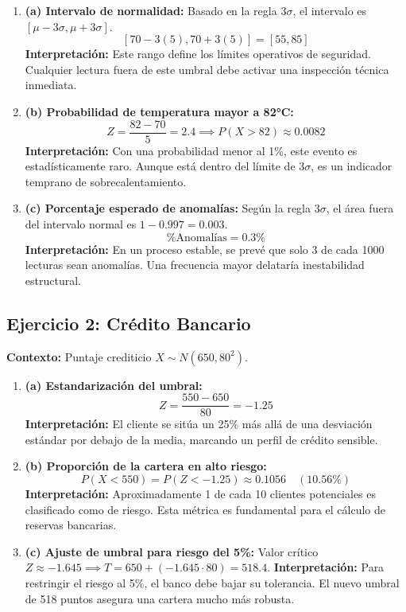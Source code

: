 \documentclass[a4paper,12pt]{article}
\begin{document}
\begin{enumerate}
    \item \textbf{(a) Intervalo de normalidad:} Basado en la regla $3\sigma$, el intervalo es $[\mu - 3\sigma, \mu + 3\sigma]$.
    \[ [70 - 3(5), 70 + 3(5)] = [55, 85] \]
    \textcolor{interpretationcolor}{\textbf{Interpretación:} Este rango define los límites operativos de seguridad. Cualquier lectura fuera de este umbral debe activar una inspección técnica inmediata.}

    \item \textbf{(b) Probabilidad de temperatura mayor a 82°C:}
    \[ Z = \frac{82 - 70}{5} = 2.4 \implies P(X > 82) \approx 0.0082 \]
    \textcolor{interpretationcolor}{\textbf{Interpretación:} Con una probabilidad menor al 1\%, este evento es estadísticamente raro. Aunque está dentro del límite de $3\sigma$, es un indicador temprano de sobrecalentamiento.}

    \item \textbf{(c) Porcentaje esperado de anomalías:} 
    Según la regla $3\sigma$, el área fuera del intervalo normal es $1 - 0.997 = 0.003$.
    \[ \% \text{Anomalías} = 0.3\% \]
    \textcolor{interpretationcolor}{\textbf{Interpretación:} En un proceso estable, se prevé que solo 3 de cada 1000 lecturas sean anomalías. Una frecuencia mayor delataría inestabilidad estructural.}
\end{enumerate}

\subsection{Ejercicio 2: Crédito Bancario}
\textbf{Contexto:} Puntaje crediticio $X \sim N(650, 80^2)$.

\begin{enumerate}
    \item \textbf{(a) Estandarización del umbral:}
    \[ Z = \frac{550 - 650}{80} = -1.25 \]
    \textcolor{interpretationcolor}{\textbf{Interpretación:} El cliente se sitúa un 25\% más allá de una desviación estándar por debajo de la media, marcando un perfil de crédito sensible.}

    \item \textbf{(b) Proporción de la cartera en alto riesgo:}
    \[ P(X < 550) = P(Z < -1.25) \approx 0.1056 \quad (10.56\%) \]
    \textcolor{interpretationcolor}{\textbf{Interpretación:} Aproximadamente 1 de cada 10 clientes potenciales es clasificado como de riesgo. Esta métrica es fundamental para el cálculo de reservas bancarias.}

    \item \textbf{(c) Ajuste de umbral para riesgo del 5\%:}
    Valor crítico $Z \approx -1.645 \implies T = 650 + (-1.645 \cdot 80) = 518.4$.
    \textcolor{interpretationcolor}{\textbf{Interpretación:} Para restringir el riesgo al 5\%, el banco debe bajar su tolerancia. El nuevo umbral de 518 puntos asegura una cartera mucho más robusta.}
\end{enumerate}
\end{document}
